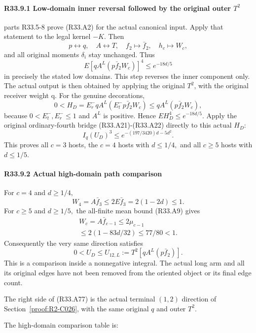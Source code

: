 \paragraph{R33.9.1 Low-domain inner reversal followed by the original outer \(T^2\)}\label{part:R33.9.1}

parts R33.5-8 prove (R33.A2) for the actual canonical input.
Apply that statement to the legal kernel \(-K\). Then
\[
p\leftrightarrow q,\quad A\leftrightarrow T,\quad
f_2\mapsto \bar f_2,\quad h_c\mapsto W_c,
\]
and all original moments \(\delta_i\) stay unchanged. Thus
\[
E[qA^L(p\bar f_2W_c)]^4\le e^{-18d/5}                 \tag{R33.A74}
\]
in precisely the stated low domains.
This step reverses the inner component only.
The actual output is then obtained by applying the
original \(T^2\), with the original receiver weight q.
For the genuine decorations,
\[
0<H_D=E_r^-qA^L(E_t^-p\bar f_2W_c)\le qA^L(p\bar f_2W_c),
\]
because \(0<E_t^-,\allowbreak \allowbreak  E_r^-\le1\) and \(A^L\) is positive.
Hence \(EH_D^4\le e^{-18d/5}\).
Apply the original ordinary-fourth bridge (R33.A21)-(R33.A22) directly to
this actual \(H_D\):
\[
I_q(U_D)^3\le e^{-(197/3420)d-5d^2}.              \tag{R33.A75}
\]
This proves all \(c=3\) hosts, the \(c=4\) hosts with \(d\le 1/4,\allowbreak \) and all \(c\ge 5\)
hosts with \(d\le 1/5.\)

\paragraph{R33.9.2 Actual high-domain path comparison}

For \(c=4\) and \(d\ge 1/4,\allowbreak \)
\[
W_4=A\bar f_3\le2E\bar f_3=2(1-2d)\le1.
\]
For \(c\ge 5\) and \(d\ge 1/5,\allowbreak \) the all-finite mean bound (R33.A9) gives
\[
\begin{gathered}
W_c=A\bar f_{c-1}\le2\mu_{c-1}\\
\le2(1-83d/32)\le77/80<1.
\end{gathered}\tag{R33.A76}
\]
Consequently the very same direction satisfies
\[
0<U_D\le U_{12,L}:=T^2[qA^L(p\bar f_2)].              \tag{R33.A77}
\]
This is a comparison inside a nonnegative integral. The actual
long arm and all its original edges have not been removed from
the oriented object or its final edge count.

The right side of (R33.A77) is the actual terminal $(1,2)$ direction of Section~\ref{proof:R2-C026}, with the same original $q$ and outer $T^2$.

The high-domain comparison table is:

